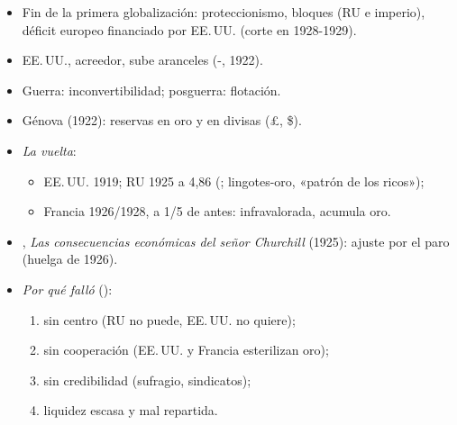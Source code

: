 \documentclass{article}
\begin{document}
\begin{columnas}
\begin{itemize}
\begin{itemize}
  \end{itemize}
\end{itemize}
\begin{itemize}
\item Fin de la primera globalización: proteccionismo, bloques (RU e imperio), déficit europeo financiado por EE.\,UU. (corte en 1928-1929).
\item EE.\,UU., acreedor, sube aranceles (-, 1922).
\end{itemize}
\begin{itemize}
\item Guerra: inconvertibilidad; posguerra: flotación.
\item Génova (1922): reservas en oro y en divisas (\pounds, \$).
\item \emph{La vuelta}:
  \begin{itemize}
  \item EE.\,UU. 1919; RU 1925 a 4,86 (; lingotes-oro, «patrón de los ricos»);
  \item Francia 1926/1928, a 1/5 de antes: infravalorada, acumula oro.
  \end{itemize}
\item {}, \emph{Las consecuencias económicas del señor Churchill} (1925): ajuste por el paro (huelga de 1926).
\item \emph{Por qué falló} ():
  \begin{enumerate}
  \item sin centro (RU no puede, EE.\,UU. no quiere);
  \item sin cooperación (EE.\,UU. y Francia esterilizan oro);
  \item sin credibilidad (sufragio, sindicatos);
  \item liquidez escasa y mal repartida.
  \end{enumerate}
\end{itemize}


\end{columnas}
\end{document}
